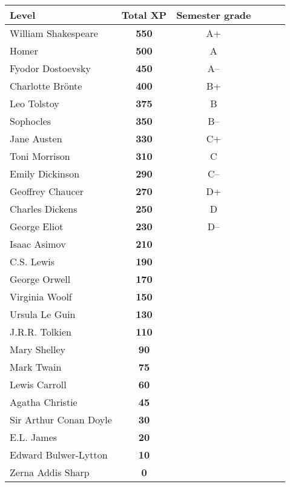 \documentclass[12pt]{article}
\begin{document}
\footnotesize
\begin{center}
\begin{tabular}{|l|c|c|c|c|c|}
\hline
Level & \textbf{Total XP} & Semester grade \\
\hline
William Shakespeare    & \textbf{550} & A+ \\
Homer                  & \textbf{500} & A \\
Fyodor Dostoevsky      & \textbf{450} & A-- \\
Charlotte Br\"{o}nte   & \textbf{400} & B+ \\
Leo Tolstoy            & \textbf{375} & B \\
Sophocles              & \textbf{350} & B-- \\
Jane Austen            & \textbf{330} & C+ \\
Toni Morrison          & \textbf{310} & C \\
Emily Dickinson        & \textbf{290} & C-- \\
Geoffrey Chaucer       & \textbf{270} & D+ \\
Charles Dickens        & \textbf{250} & D \\
George Eliot           & \textbf{230} & D-- \\
Isaac Asimov           & \textbf{210} & \\
C.S. Lewis             & \textbf{190} &  \\
George Orwell          & \textbf{170} &  \\
Virginia Woolf         & \textbf{150} &  \\
Ursula Le Guin         & \textbf{130} &  \\
J.R.R. Tolkien         & \textbf{110} & \\
Mary Shelley           & \textbf{90} & \\
Mark Twain             & \textbf{75} & \\
Lewis Carroll          & \textbf{60} &  \\
Agatha Christie        & \textbf{45} &  \\
Sir Arthur Conan Doyle & \textbf{30} &  \\
E.L. James             & \textbf{20} &  \\
Edward Bulwer-Lytton   & \textbf{10} &  \\
Zerna Addis Sharp      & \textbf{0} & \\
\hline
\end{tabular}
\end{center}
\normalsize
\end{document}
